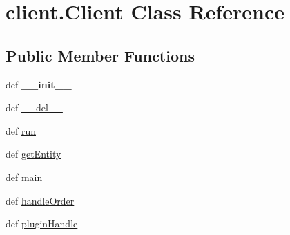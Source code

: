 \hypertarget{classclient_1_1_client}{\section{client.\-Client \-Class \-Reference}
\label{classclient_1_1_client}
}
\subsection*{\-Public \-Member \-Functions}
\begin{DoxyCompactItemize}
\item 
\hypertarget{classclient_1_1_client_a02d35b9c722c0434fda44d8b67274f8b}{def {\bfseries \-\_\-\-\_\-init\-\_\-\-\_\-}}\label{classclient_1_1_client_a02d35b9c722c0434fda44d8b67274f8b}

\item 
def \hyperlink{classclient_1_1_client_a81808356345d9f5b1c37200ce09a03cf}{\-\_\-\-\_\-del\-\_\-\-\_\-}
\item 
def \hyperlink{classclient_1_1_client_a611a6aa5f1b60a60270b1cacc3522cb8}{run}
\item 
def \hyperlink{classclient_1_1_client_aeff3316ccd3dc3efc6e216657ad11209}{get\-Entity}
\item 
def \hyperlink{classclient_1_1_client_a29ca5ab810f2b176127fabe4a6e6e9f2}{main}
\item 
def \hyperlink{classclient_1_1_client_a411fe3cb0e6bd641925c600482025075}{handle\-Order}
\item 
def \hyperlink{classclient_1_1_client_ab33a0618c1e787648f00d5f36cb4fec8}{plugin\-Handle}
\end{DoxyCompactItemize}
